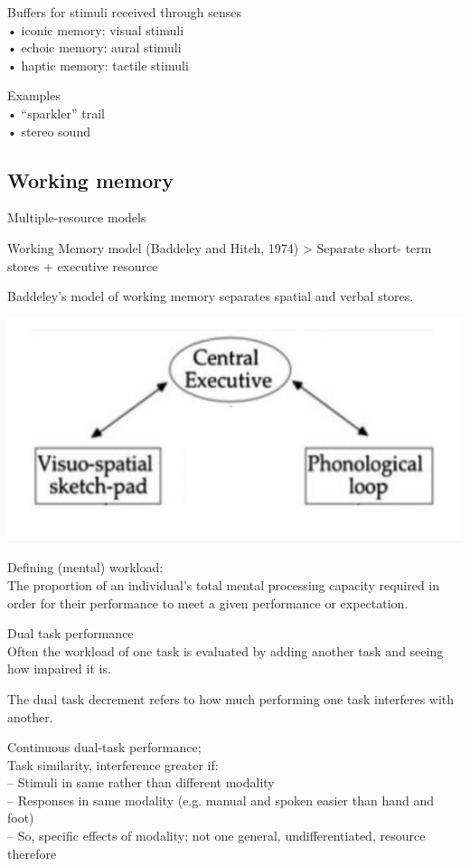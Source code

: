 \documentclass[]{project_plan}
\begin{document}
Buffers for stimuli received through senses\\
• iconic memory: visual stimuli\\
• echoic memory: aural stimuli\\
• haptic memory: tactile stimuli

Examples\\
• “sparkler” trail\\
• stereo sound\\

\subsection{Working memory}
Multiple-resource models

Working Memory model (Baddeley and Hitch, 1974) > Separate short- term stores + executive resource

Baddeley’s model of working memory separates spatial and verbal stores.

\includegraphics[width=0.5\linewidth]{working_memory_model.png}

Defining (mental) workload:\\
The proportion of an individual’s total mental processing capacity
required in order for their performance to meet a given performance or
expectation.

Dual task performance\\
Often the workload of one task is evaluated by adding another task
and seeing how impaired it is.

The dual task decrement refers to how much performing one task interferes with another.

Continuous dual-task performance;\\
Task similarity, interference greater if:\\
– Stimuli in same rather than different modality\\
– Responses in same modality (e.g. manual and spoken easier than hand and foot)\\
– So, specific effects of modality; not one general, undifferentiated, resource therefore\\
\end{document}
